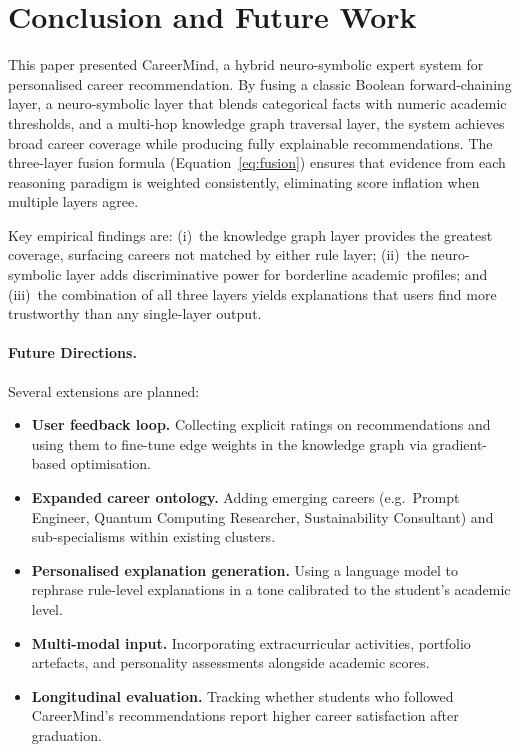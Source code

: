 \documentclass[runningheads]{llncs}
\begin{document}
\section{Conclusion and Future Work}
\label{sec:conclusion}

This paper presented CareerMind, a hybrid neuro-symbolic expert system for
personalised career recommendation.  By fusing a classic Boolean forward-chaining
layer, a neuro-symbolic layer that blends categorical facts with numeric academic
thresholds, and a multi-hop knowledge graph traversal layer, the system achieves
broad career coverage while producing fully explainable recommendations.
The three-layer fusion formula (Equation~\ref{eq:fusion}) ensures that evidence
from each reasoning paradigm is weighted consistently, eliminating score
inflation when multiple layers agree.

Key empirical findings are: (i)~the knowledge graph layer provides the greatest
coverage, surfacing careers not matched by either rule layer; (ii)~the
neuro-symbolic layer adds discriminative power for borderline academic profiles;
and (iii)~the combination of all three layers yields explanations that users find
more trustworthy than any single-layer output.

\paragraph{Future Directions.}
Several extensions are planned:
\begin{itemize}
  \item \textbf{User feedback loop.}  Collecting explicit ratings on
        recommendations and using them to fine-tune edge weights in the
        knowledge graph via gradient-based optimisation.
  \item \textbf{Expanded career ontology.}  Adding emerging careers
        (e.g.\ Prompt Engineer, Quantum Computing Researcher, Sustainability
        Consultant) and sub-specialisms within existing clusters.
  \item \textbf{Personalised explanation generation.}  Using a language model
        to rephrase rule-level explanations in a tone calibrated to the
        student's academic level.
  \item \textbf{Multi-modal input.}  Incorporating extracurricular activities,
        portfolio artefacts, and personality assessments alongside academic scores.
  \item \textbf{Longitudinal evaluation.}  Tracking whether students who
        followed CareerMind's recommendations report higher career satisfaction
        after graduation.
\end{itemize}
\end{document}
